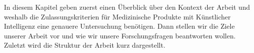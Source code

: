 In diesem Kapitel geben zuerst einen Überblick über den Kontext der Arbeit und weshalb die Zulassungskriterien für Medizinische Produkte mit Künstlicher Intelligenz eine genauere Untersuchung benötigen. Dann stellen wir die Ziele unserer Arbeit vor und wie wir unsere Forschungsfragen beantworten wollen. Zuletzt wird die Struktur der Arbeit kurz dargestellt.